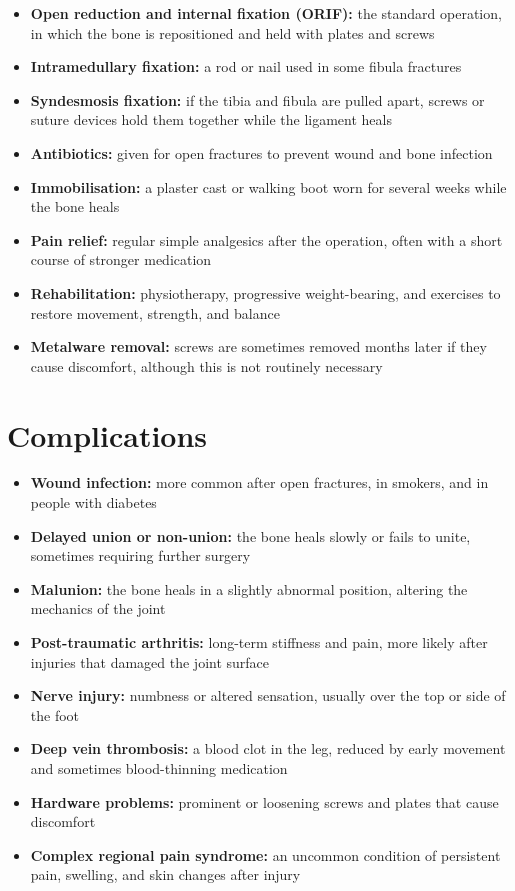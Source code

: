 \begin{itemize}
    \item \textbf{Open reduction and internal fixation (ORIF):} the standard operation, in which the bone is repositioned and held with plates and screws
    \item \textbf{Intramedullary fixation:} a rod or nail used in some fibula fractures
    \item \textbf{Syndesmosis fixation:} if the tibia and fibula are pulled apart, screws or suture devices hold them together while the ligament heals
    \item \textbf{Antibiotics:} given for open fractures to prevent wound and bone infection
    \item \textbf{Immobilisation:} a plaster cast or walking boot worn for several weeks while the bone heals
    \item \textbf{Pain relief:} regular simple analgesics after the operation, often with a short course of stronger medication
    \item \textbf{Rehabilitation:} physiotherapy, progressive weight-bearing, and exercises to restore movement, strength, and balance
    \item \textbf{Metalware removal:} screws are sometimes removed months later if they cause discomfort, although this is not routinely necessary
\end{itemize}

\section*{Complications}
\begin{itemize}
    \item \textbf{Wound infection:} more common after open fractures, in smokers, and in people with diabetes
    \item \textbf{Delayed union or non-union:} the bone heals slowly or fails to unite, sometimes requiring further surgery
    \item \textbf{Malunion:} the bone heals in a slightly abnormal position, altering the mechanics of the joint
    \item \textbf{Post-traumatic arthritis:} long-term stiffness and pain, more likely after injuries that damaged the joint surface
    \item \textbf{Nerve injury:} numbness or altered sensation, usually over the top or side of the foot
    \item \textbf{Deep vein thrombosis:} a blood clot in the leg, reduced by early movement and sometimes blood-thinning medication
    \item \textbf{Hardware problems:} prominent or loosening screws and plates that cause discomfort
    \item \textbf{Complex regional pain syndrome:} an uncommon condition of persistent pain, swelling, and skin changes after injury
\end{itemize}

